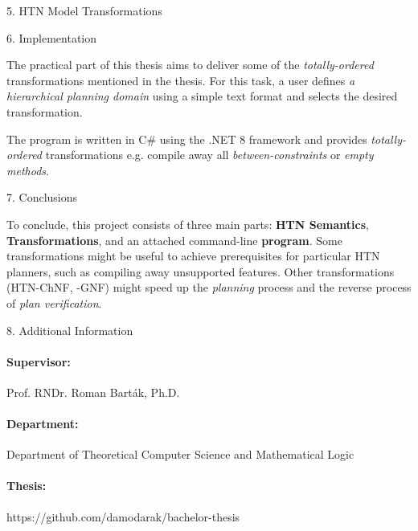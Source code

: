 \documentclass[portrait,a0paper,fontscale=0.25]{baposter}
\begin{document}
\begin{poster}
\begin{posterbox}[column=1, name=trans]{5. HTN Model Transformations}
\end{posterbox}

\begin{posterbox}[column=1, name=implementation, below=trans]{6. Implementation}

The practical part of this thesis aims to deliver some of the \emph{totally-ordered} transformations mentioned in the thesis. For this task, a user defines \emph{a hierarchical planning domain} using a simple text format and selects the desired transformation.

\vspace{5mm}

The program is written in C\# using the .NET 8 framework and provides \emph{totally-ordered} transformations e.g. compile away all \emph{between-constraints} or \emph{empty methods}.


\end{posterbox}

\begin{posterbox}[column=1, name=conclusion, below=implementation, headerColorOne=green!59!yellow, boxColorOne=green!10]{7. Conclusions}

To conclude, this project consists of three main parts: \textbf{HTN Semantics}, \textbf{Transformations}, and an attached command-line \textbf{program}. Some transformations might be useful to achieve prerequisites for particular HTN planners, such as compiling away unsupported features. Other transformations (HTN-ChNF, -GNF) might speed up the \emph{planning} process and the reverse process of \emph{plan verification}.

\end{posterbox}

\begin{posterbox}[column=1, name=info, below=conclusion]{8. Additional Information}

\paragraph{Supervisor:} Prof. RNDr. Roman Barták, Ph.D.
\paragraph{Department:} Department of Theoretical Computer Science and Mathematical Logic
\paragraph{Thesis:} https://github.com/damodarak/bachelor-thesis

\end{posterbox}

\end{poster}
\end{document}
